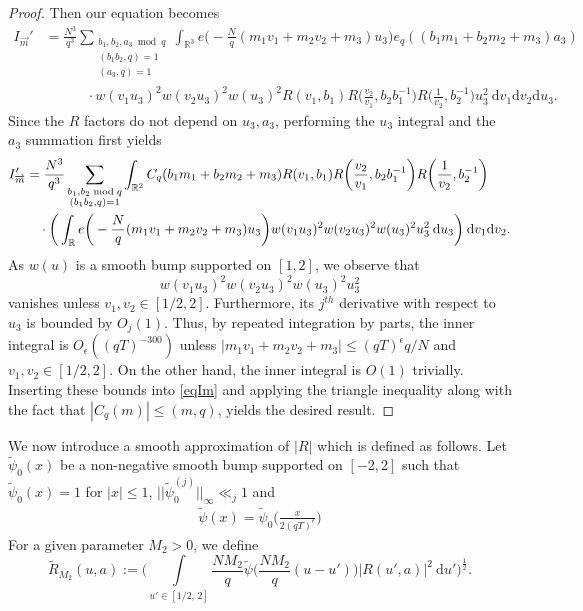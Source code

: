 \documentclass[12pt]{amsart}
\theoremstyle{definition}
\theoremstyle{plain}
\theoremstyle{remark}
\numberwithin{equation}{section}
\numberwithin{theorem}{section}
\numberwithin{equation}{section}
\begin{document}
\begin{proof}
		Then our equation becomes 
		\begin{align*}
			I_{\overrightarrow{m}}'
			&=\frac{N^{3}}{q^{3}}\sum_{\substack{b_1,b_2,a_3 \bmod q \\ (b_1b_2,q)=1 \\ (a_3,q)=1}}\int_{\mathbb{R}^{3}}e\bigg(-\frac{N}{q}(m_{1}v_{1}+m_{2}v_{2}+m_{3})u_{3}\bigg)e_q({(b_{1}m_{1}+b_{2}m_{2}+m_{3})a_{3}})
			\\
			&\quad \quad \quad\cdot w(v_{1}u_{3})^{2}w(v_{2}u_{3})^{2}w(u_{3})^{2}R(v_{1}, b_{1})R\bigg(\frac{v_{2}}{v_{1}}, b_{2}b_{1}^{-1}\bigg)R\bigg(\frac{1}{v_{2}}, b_{2}^{-1}\bigg)u_{3}^{2}\:\mathrm{d}v_{1}\mathrm{d}v_{2}\mathrm{d}u_{3}.
		\end{align*}
		Since the $R$ factors do not depend on $u_{3}, a_{3}$, performing the $u_{3}$ integral and the $a_{3}$ summation first yields
		\begin{align}\label{eqIm}
			I_{\overrightarrow{m}}'
			&=\frac{N^{3}}{q^{3}}\sum_{\substack{ b_1,b_2 \bmod q \\ (b_1b_2, q)=1}}\int_{\mathbb{R}^{2}}C_{q}(b_{1}m_{1}+b_{2}m_{2}+m_{3})R(v_{1}, b_{1})R\bigg(\frac{v_{2}}{v_{1}}, b_{2}b_{1}^{-1}\bigg)R\bigg(\frac{1}{v_{2}}, b_{2}^{-1}\bigg)
			\notag
			\\
			&\quad\cdot \bigg(\int_{\mathbb{R}}e\bigg(-\frac{N}{q}(m_{1}v_{1}+m_{2}v_{2}+m_{3})u_{3}\bigg)w(v_{1}u_{3})^{2}w(v_{2}u_{3})^{2}w(u_{3})^{2}u_{3}^{2}\:\mathrm{d}u_{3}\bigg)\:\mathrm{d}v_{1}\mathrm{d}v_{2}.
		\end{align}
		As $w(u)$ is a smooth bump supported on $[1, 2]$, we observe that \[w(v_{1}u_{3})^{2}w(v_{2}u_{3})^{2}w(u_{3})^{2}u_{3}^{2}\] vanishes unless $v_{1}, v_{2} \in [1/2, 2]$. Furthermore, its $j^{th}$ derivative with respect to $u_{3}$ is bounded by $O_{j}(1)$. Thus, by repeated integration by parts, the inner integral is $O_{\epsilon}((qT)^{-300})$ unless $|m_{1}v_{1}+m_{2}v_{2}+m_{3}| \leq(qT)^{\epsilon}q/N$ and $v_{1}, v_{2}\in [1/2, 2]$. On the other hand, the inner integral is $O(1)$ trivially. 
		Inserting these bounds into \eqref{eqIm} and applying the triangle inequality along with the fact that $|C_{q}(m)| \leq (m,q)$, yields the desired result.
	\end{proof}
	
	We now introduce a smooth approximation of $|R|$ which is defined as follows.
	Let $\tilde{\psi}_{0}(x)$ be a non-negative smooth bump supported on $[-2, 2]$ such that $\tilde{\psi}_{0}(x)=1$ for $|x|\leq 1$, $||\tilde{\psi}_0^{(j)}||_{\infty} \ll_j 1$ and
	\begin{align}
		\tilde{\psi}(x)=\tilde{\psi}_{0}\bigg(\frac{x}{2(qT)^{\epsilon}}\bigg) \label{psi definition}
	\end{align}
	For a given parameter $M_{2}>0$, we define
	\begin{equation}\label{deftiR}
		\tilde{R}_{M_{2}}(u, a):= \bigg(\int\limits_{ u' \in [1/2,\, 2]}\frac{NM_{2}}{q}\tilde{\psi}\bigg(\frac{NM_{2}}{q}(u-u')\bigg)| R(u', a)|^{2}
		\:\mathrm{d}u' \bigg)^{\frac{1}{2}}.
	\end{equation}
	
\end{document}
